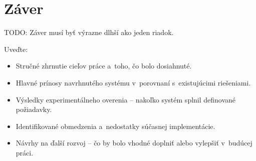 ﻿\chapter{Záver}
\label{Zaver}

TODO: Záver musí byť výrazne dlhší ako jeden riadok.

Uveďte:
\begin{itemize}
    \item Stručné zhrnutie cieľov práce a~toho, čo bolo dosiahnuté.
    \item Hlavné prínosy navrhnutého systému v~porovnaní s~existujúcimi riešeniami.
    \item Výsledky experimentálneho overenia -- nakoľko systém splnil definované požiadavky.
    \item Identifikované obmedzenia a~nedostatky súčasnej implementácie.
    \item Návrhy na ďalší rozvoj -- čo by bolo vhodné doplniť alebo vylepšiť v~budúcej práci.
\end{itemize}
